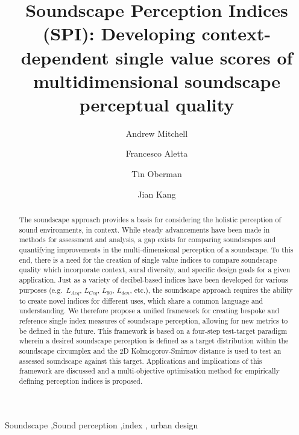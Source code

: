 \documentclass[
  authoryear,
  3p]{elsarticle}
\begin{document}
\begin{frontmatter}
\title{Soundscape Perception Indices (SPI): Developing context-dependent
single value scores of multidimensional soundscape perceptual quality}
\author[1,2]{Andrew Mitchell%
%
}
\author[2]{Francesco Aletta%
%
}
\author[2]{Tin Oberman%
%
}
\author[2]{Jian Kang%
%
}






        
\begin{abstract}
The soundscape approach provides a basis for considering the holistic
perception of sound environments, in context. While steady advancements
have been made in methods for assessment and analysis, a gap exists for
comparing soundscapes and quantifying improvements in the
multi-dimensional perception of a soundscape. To this end, there is a
need for the creation of single value indices to compare soundscape
quality which incorporate context, aural diversity, and specific design
goals for a given application. Just as a variety of decibel-based
indices have been developed for various purposes (e.g.~\(L_{Aeq}\),
\(L_{Ceq}\), \(L_{90}\), \(L_{den}\), etc.), the soundscape approach
requires the ability to create novel indices for different uses, which
share a common language and understanding. We therefore propose a
unified framework for creating bespoke and reference single index
measures of soundscape perception, allowing for new metrics to be
defined in the future. This framework is based on a four-step
test-target paradigm wherein a desired soundscape perception is defined
as a target distribution within the soundscape circumplex and the 2D
Kolmogorov-Smirnov distance is used to test an assessed soundscape
against this target. Applications and implications of this framework are
discussed and a multi-objective optimisation method for empirically
defining perception indices is proposed.
\end{abstract}





\begin{keyword}
    Soundscape \sep Sound perception \sep index \sep 
    urban design
\end{keyword}
\end{frontmatter}
    
\end{document}

